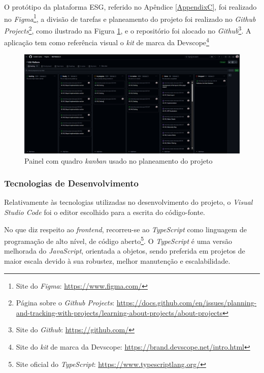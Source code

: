 O protótipo da plataforma \gls{ESG}, referido no Apêndice \ref{AppendixC}, foi realizado no \textit{Figma}\footnote{Site do \textit{Figma}: \url{https://www.figma.com/}}, a divisão de tarefas e planeamento do projeto foi realizado no \textit{Github Projects}\footnote{Página sobre o \textit{Github Projects}: \url{https://docs.github.com/en/issues/planning-and-tracking-with-projects/learning-about-projects/about-projects}}, como ilustrado na Figura \ref{fig:kanbanBoard}, e o repositório foi alocado no \textit{Github}\footnote{Site do \textit{Github}: \url{https://github.com/}}. A aplicação tem como referência visual o \textit{kit} de marca da Devscope\footnote{Site do \textit{kit} de marca da Devscope: \url{https://brand.devscope.net/intro.html}}

\begin{figure}[H]
    \centering
    \includegraphics[width=\linewidth,keepaspectratio]{frontmatter/assets/github_projects.png}
    \caption{Painel com quadro \textit{kanban} usado no planeamento do projeto}
    \label{fig:kanbanBoard}
\end{figure}

\subsubsection{Tecnologias de Desenvolvimento}

Relativamente às tecnologias utilizadas no desenvolvimento do projeto, o \textit{Visual Studio Code} foi o editor escolhido para a escrita do código-fonte.

No que diz respeito ao \textit{frontend}, recorreu-se ao \textit{TypeScript} como linguagem de programação de alto nível, de código aberto\footnote{Site oficial do \textit{TypeScript}: \url{https://www.typescriptlang.org/}}. O \textit{TypeScript} é uma versão melhorada do \textit{JavaScript}, orientada a objetos, sendo preferida em projetos de maior escala devido à sua robustez, melhor manutenção e escalabilidade.

